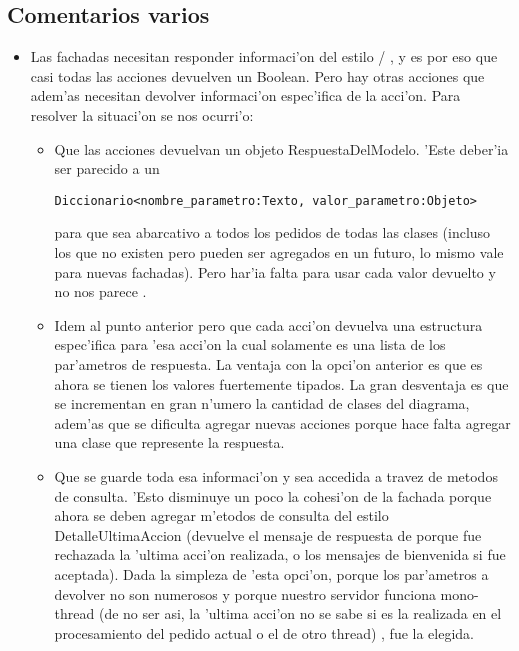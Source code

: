 \subsection{Comentarios varios}
\begin{itemize}
\item Las fachadas necesitan responder informaci'on del estilo  / , y es por eso que casi todas las acciones devuelven un Boolean. Pero hay otras acciones que adem'as necesitan devolver informaci'on espec'ifica de la acci'on. Para resolver la situaci'on se nos ocurri'o:
	\begin{itemize}
	\item Que las acciones devuelvan un objeto RespuestaDelModelo. 'Este deber'ia ser parecido a un 

\verb|Diccionario<nombre_parametro:Texto, valor_parametro:Objeto>| 

para que sea abarcativo a todos los pedidos de todas las clases (incluso los que no existen pero pueden ser agregados en un futuro, lo mismo vale para nuevas fachadas). Pero har'ia falta  para usar cada valor devuelto y no nos parece .
	\item Idem al punto anterior pero que cada acci'on devuelva una estructura espec'ifica para 'esa acci'on la cual solamente es una lista de los par'ametros de respuesta. La ventaja con la opci'on anterior es que es ahora se tienen los valores fuertemente tipados. La gran desventaja es que se incrementan en gran n'umero la cantidad de clases del diagrama, adem'as que se dificulta agregar nuevas acciones porque hace falta agregar una clase que represente la respuesta.
	\item Que se guarde toda esa informaci'on y sea accedida a travez de metodos de consulta. 'Esto disminuye un poco la cohesi'on de la fachada porque ahora se deben agregar m'etodos de consulta del estilo DetalleUltimaAccion (devuelve el mensaje de respuesta de porque fue rechazada la 'ultima acci'on realizada, o los mensajes de bienvenida si fue aceptada). Dada la simpleza de 'esta opci'on, porque los par'ametros a devolver no son numerosos y porque nuestro servidor funciona mono-thread (de no ser asi, la 'ultima acci'on no se sabe si es la realizada en el procesamiento del pedido actual o el de otro thread) , fue la elegida.
	\end{itemize}


\end{itemize}
